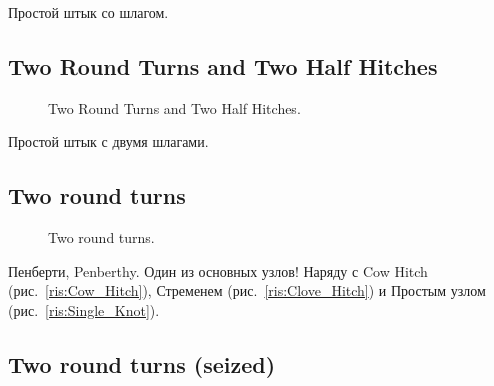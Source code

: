 Простой штык со шлагом.

\subsection{Two Round Turns and Two Half Hitches}

\begin{figure}[H]\centering
	\begin{minipage}{1\linewidth}
		\begin{center}
			\tcbox[enhanced jigsaw,colframe=black,opacityframe=0.5,opacityback=0.5]
			{\centering{}}
		\end{center}
	\end{minipage}
\caption{Two Round Turns and Two Half Hitches.}
\label{ris:Two_Round_Turns_and_Two_Half_Hitches}
\end{figure}

Простой штык с двумя шлагами.

\subsection{Two round turns}

\begin{figure}[H]\centering
	\begin{minipage}{1\linewidth}
		\begin{center}
			\tcbox[enhanced jigsaw,colframe=black,opacityframe=0.5,opacityback=0.5]
			{\centering{}}
		\end{center}
	\end{minipage}
\caption{Two round turns.}
\label{ris:Two_round_turns}
\end{figure}

Пенберти, Penberthy. Один из основных узлов! Наряду с Cow Hitch (рис.~\ref{ris:Cow_Hitch}), Стременем (рис.~\ref{ris:Clove_Hitch}) и Простым узлом (рис.~\ref{ris:Single_Knot}).


\subsection{Two round turns (seized)}

